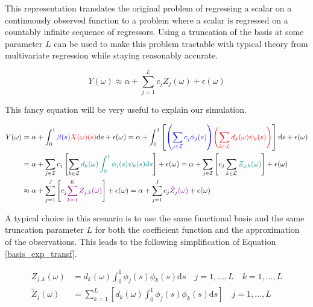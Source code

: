 \documentclass[11pt,twoside,a4paper]{article}
\begin{document}
	This representation translates the original problem of regressing a scalar on a continuously observed function to a problem where a scalar is regressed on a countably infinite sequence of regressors. Using a truncation of the basis at some parameter $L$ can be used to make this problem tractable with typical theory from multivariate regression while staying reasonably accurate.
	
	\begin{equation}
			Y(\omega) \approx \alpha + \sum_{j = 1}^{L} c_j Z_j(\omega) + \epsilon(\omega)
	\end{equation}

	{\color{red} This fancy equation will be very useful to explain our simulation.}
	
	\begin{equation}\label{basis_exp_transf}
		\begin{split}
			Y(\omega) & = \alpha + \int_{0}^{1} {\color{blue}\beta(s)} {\color{red}X(\omega)(s)}\mathrm{d}s + \epsilon(\omega)
			 = \alpha + \int_{0}^{1}\left[{\color{blue}\left(\sum_{j \in \mathcal{I}} c_j  \phi_j(s)\right)} {\color{red}\left(\sum_{k \in \mathcal{L}} d_k(\omega)  \psi_k(s)\right)} \right]\mathrm{d}s + \epsilon(\omega) \\
			& = \alpha + \sum_{j \in \mathcal{I}} c_j \left[\sum_{k \in \mathcal{L}} \textcolor{teal}{d_k(\omega) \int_{0}^{1} \phi_j(s) \psi_k(s) \mathrm{d}s}\right] + \epsilon(\omega) 
			= \alpha + \sum_{j \in \mathcal{I}} \left[ c_j \sum_{k \in \mathcal{L}} \textcolor{teal}{Z_{j, k}(\omega)} \right] + \epsilon(\omega) \\
			& \approx \alpha + \sum_{j = 1}^{J} \left[c_j {\color{violet}\sum_{k = 1}^{K}  Z_{j, k}(\omega)} \right] + \epsilon(\omega) 
			= \alpha + \sum_{j = 1}^{J} c_j {\color{violet}\tilde{Z}_j(\omega)} + \epsilon(\omega) 
		\end{split}
	\end{equation}

	A typical choice in this scenario is to use the same functional basis and the same truncation parameter $L$ for both the coefficient function and the approximation of the observations. This leads to the following simplification of Equation \ref{basis_exp_transf}.

	\begin{equation}
		\begin{split}
			Z_{j, k}(\omega) & = d_k(\omega) \int_{0}^{1} \phi_j(s) \phi_k(s) \mathrm{d}s \quad j = 1, \dots, L \quad k = 1, \dots, L \\
			\tilde{Z}_j(\omega) & = \sum_{k = 1}^{L} \left[d_k(\omega) \int_{0}^{1} \phi_j(s) \phi_k(s) \mathrm{d}s \right] \quad j = 1, \dots, L
		\end{split}
	\end{equation}
	
\end{document}
